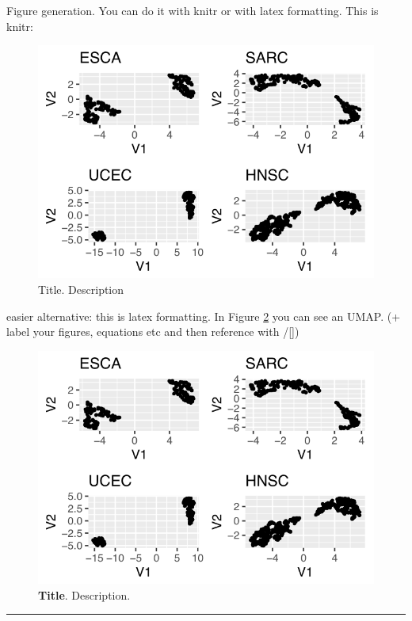 \documentclass[
  parskip,
  oneside]{scrreprt}
\begin{document}
Figure generation. You can do it with knitr or with latex formatting.
This is knitr:

\begin{figure}
\includegraphics[width=9.44in]{figures/figure1} \caption{Title. Description}\label{fig:figure1}
\end{figure}

easier alternative: this is latex formatting. In Figure \ref{figure1}
you can see an UMAP. (+ label your figures, equations etc and then
reference with /\ref{})

\begin{figure}[htbp]
    \centering
    \includegraphics{figures/figure1.png}
    \caption[\textbf{Title}.]{\textbf{Title}. Description.}
    \label{figure1}
\end{figure}

\begin{center}\rule{0.5\linewidth}{0.5pt}\end{center}
\end{document}
